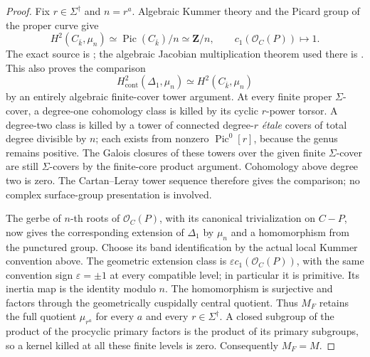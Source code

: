 \begin{proof}
Fix $r\in\Sigma^\dagger$ and $n=r^a$. Algebraic Kummer theory
and the Picard group of the proper curve give
\[
 H^2(C_{\bar k},\mu_n)\simeq\operatorname{Pic}(C_{\bar k})/n
       \simeq\mathbf Z/n,
 \qquad c_1(\mathcal O_C(P))\longmapsto1.
\]
The exact source is \citet[Propositions 14.1--14.2]{CF_Milne2013};
the algebraic Jacobian multiplication theorem used there is
\citet[Theorem 8.2 and Remark 8.4]{CF_MilneAV1986}.
This also proves the comparison
\[
 H^2_{\mathrm{cont}}(\Delta_1,\mu_n)
           \simeq H^2(C_{\bar k},\mu_n)
\]
by an entirely algebraic finite-cover tower argument. At every
finite proper $\Sigma$-cover, a degree-one cohomology class is
killed by its cyclic $r$-power torsor. A degree-two class is killed
by a tower of connected degree-$r$ \emph{\'etale} covers of
total degree divisible by $n$; each exists from nonzero
$\operatorname{Pic}^0[r]$, because the genus remains positive.
The Galois closures of these towers over the given finite
$\Sigma$-cover are still $\Sigma$-covers by the finite-core
product argument. Cohomology above degree two is zero. The
Cartan--Leray tower sequence
\citep[Theorem 14.9 and Remark 14.10]{CF_Milne2013} therefore
gives the comparison; no complex surface-group presentation is
involved.

The gerbe of $n$-th roots of $\mathcal O_C(P)$, with its
canonical trivialization on $C-P$, now gives the corresponding
extension of $\Delta_1$ by $\mu_n$ and a homomorphism from the
punctured group. Choose its band identification by the actual
local Kummer convention above. The geometric extension class
is $\varepsilon c_1(\mathcal O_C(P))$, with the same convention
sign $\varepsilon=\pm1$ at every compatible level; in particular
it is primitive. Its inertia map is the identity modulo $n$.
The homomorphism is surjective and factors through the
geometrically cuspidally central quotient. Thus $M_F$ retains
the full quotient $\mu_{r^a}$ for every $a$ and every
$r\in\Sigma^\dagger$. A closed subgroup of the product of the
procyclic primary factors is the product of its primary
subgroups, so a kernel killed at all these finite levels is zero.
Consequently $M_F=M$.


\end{proof}
